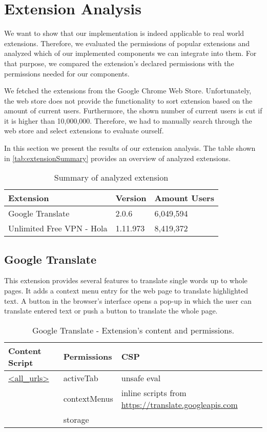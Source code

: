 
\chapter{Extension Analysis}
	
	We want to show that our implementation is indeed applicable to real world extensions. Therefore, we evaluated the permissions of popular extensions and analyzed which of our implemented components we can integrate into them. For that purpose, we compared the extension's declared permissions with the permissions needed for our components. 
	
	We fetched the extensions from the Google Chrome Web Store. Unfortunately, the web store does not provide the functionality to sort extension based on the amount of current users. Furthermore, the shown number of current users is cut if it is higher than 10,000,000. Therefore, we had to manually search through the web store and select extensions to evaluate ourself. 
	
	In this section we present the results of our extension analysis. The table shown in \autoref{tab:extensionSummary} provides an overview of analyzed extensions.
	
	\begin{table}[h]
		\centering
		\begin{tabular}{|l|l|l|} \hline
			\textbf{Extension} & \textbf{Version} & \textbf{Amount Users} \\ \hline
			Google Translate & 2.0.6 & 6,049,594 \\ 
			Unlimited Free VPN - Hola & 1.11.973 & 8,419,372 \\ \hline
		\end{tabular}
		\caption{Summary of analyzed extension}
		\label{tab:extensionSummary}
	\end{table}
	
	
\section{Google Translate}
	This extension provides several features to translate single words up to whole pages. It adds a context menu entry for the web page to translate highlighted text. A button in the browser's interface opens a pop-up in which the user can translate entered text or push a button to translate the whole page.
	
	\begin{table}[h]
		\centering
		\begin{tabular}{|l|l|l|} \hline
			\textbf{Content Script} & \textbf{Permissions} & \textbf{CSP} \\ \hline
			\url{<all_urls>} & activeTab & unsafe eval \\
			 & contextMenus & inline scripts from \url{https://translate.googleapis.com} \\
			& storage & \\ \hline
		\end{tabular}
		\caption{Google Translate - Extension's content and permissions.}
	\end{table}
	
